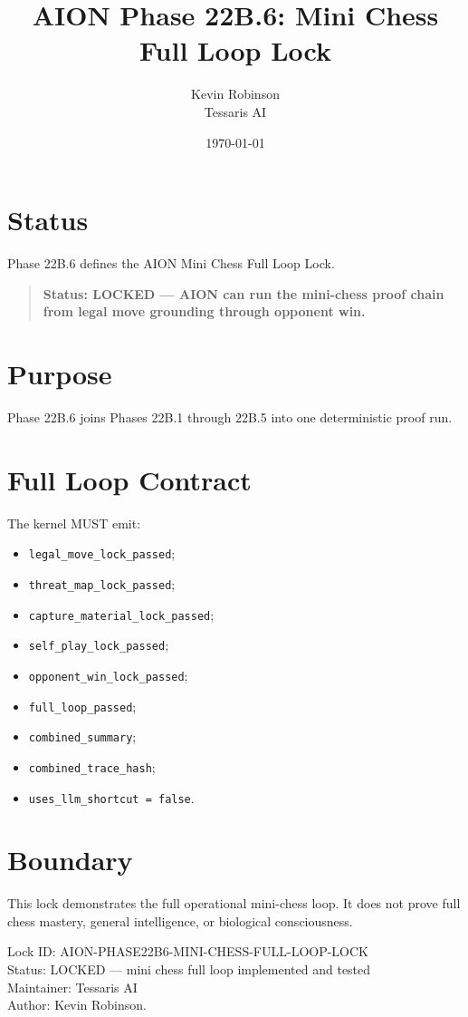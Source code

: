 \documentclass[11pt,a4paper]{article}
\title{\textbf{AION Phase 22B.6: Mini Chess Full Loop Lock}}
\author{Kevin Robinson\\Tessaris AI}
\date{\today}
\begin{document}
\maketitle

\section{Status}

Phase 22B.6 defines the AION Mini Chess Full Loop Lock.

\begin{quote}
\textbf{Status: LOCKED --- AION can run the mini-chess proof chain from legal move grounding through opponent win.}
\end{quote}

\section{Purpose}

Phase 22B.6 joins Phases 22B.1 through 22B.5 into one deterministic proof run.

\section{Full Loop Contract}

The kernel MUST emit:

\begin{itemize}
  \item \texttt{legal\_move\_lock\_passed};
  \item \texttt{threat\_map\_lock\_passed};
  \item \texttt{capture\_material\_lock\_passed};
  \item \texttt{self\_play\_lock\_passed};
  \item \texttt{opponent\_win\_lock\_passed};
  \item \texttt{full\_loop\_passed};
  \item \texttt{combined\_summary};
  \item \texttt{combined\_trace\_hash};
  \item \texttt{uses\_llm\_shortcut = false}.
\end{itemize}

\section{Boundary}

This lock demonstrates the full operational mini-chess loop. It does not prove full chess mastery, general intelligence, or biological consciousness.

\bigskip

\noindent
Lock ID: AION-PHASE22B6-MINI-CHESS-FULL-LOOP-LOCK\\
Status: LOCKED --- mini chess full loop implemented and tested\\
Maintainer: Tessaris AI\\
Author: Kevin Robinson.
\end{document}
